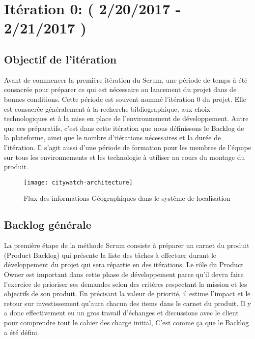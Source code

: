 \section{Itération 0: ( 2/20/2017 - 2/21/2017 )}

\subsection{Objectif de l'itération}

Avant de commencer la première itération du Scrum, une période de temps à été
consacrée pour préparer ce qui est nécessaire au lancement du projet dans de
bonnes conditions. Cette période est souvent nommé l'itération 0 du projet.
Elle est consacrée généralement à la recherche bibliographique, aux choix
technologiques et à la mise en place de l'environnement de développement. Autre
que ces préparatifs, c'est dans cette itération que nous définissons le Backlog
de la plateforme, ainsi que le nombre d'itérations nécessaires et la durée de
l'itération. Il s'agit aussi d'une période de formation pour les membres de
l'équipe sur tous les environnements et les technologie à utiliser au cours du
montage du produit.

\begin{figure}[htbp]
  \centering
  \texttt{[image: citywatch-architecture]}
  \caption[Flux des information Géographiques en CityWatch]
  {Flux des informations Géographiques dans le système de localisation}
  \label{fig:citywatch-architecture}
\end{figure}

\subsection{Backlog générale}

La première étape de la méthode Scrum consiste à préparer un carnet du produit
(Product Backlog) qui présente la liste des tâches à effectuer durant le
développement du projet qui sera répartie en des itérations. Le rôle du
Product Owner est important dans cette phase de développement parce qu'il devra
faire l'exercice de prioriser ses demandes selon des critères respectant la
mission et les objectifs de son produit. En précisant la valeur de priorité, il
estime l'impact et le retour sur investissement qu'aura chacun des items dans
le carnet du produit. Il y a donc effectivement eu un gros travail d'échanges
et discussions avec le client pour comprendre tout le cahier des charge
initial, C'est comme ça que le Backlog a été défini.

